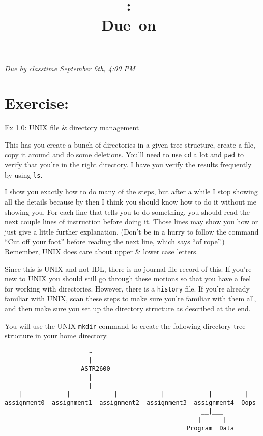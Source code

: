 \documentclass{article}
\title{\vspace{2in}\textmd{\textbf{\hmwkClass:\ \hmwkTitle}}\\\normalsize\vspace{0.1in}\small{Due\ on\ \hmwkDueDate}\\\vspace{0.1in}\large{}\vspace{3in}}
\date{}
\newcommand{\hmwkDueDate}{September 6th, 4:00 PM}
\begin{document}
\begin{spacing}{1.0}
\newpage
\emph{  Due by classtime \hmwkDueDate}
\section{\textbf{Exercise:} }

Ex 1.0: UNIX file \& directory management

This has you create a bunch of directories in a given tree structure, create a
file, copy it around and do some deletions.  You’ll need to use \texttt{cd} a lot and
\texttt{pwd} to verify that you’re in the right directory.  I have you verify the
results frequently by using \texttt{ls}.

I show you exactly how to do many of the steps, but after a while I stop
showing all the details because by then I think you should know how to do it
without me showing you.  For each line that tells you to do something, you
should read the next couple lines of instruction before doing it.  Those lines
may show you how or just give a little further explanation.  (Don’t be in a
hurry to follow the command “Cut off your foot” before reading the next line,
which says “of rope”.)  Remember, UNIX does care about upper \& lower case
letters.
	
Since this is UNIX and not IDL, there is no journal file record of this.  If
you’re new to UNIX you should still go through these motions so that you have a
feel for working with directories.  However, there is a \texttt{history} file.
If you’re already familiar with UNIX, scan these steps to make sure you’re
familiar with them all, and then make sure you set up the directory structure
as described at the end.

You will use the UNIX \texttt{mkdir} command to create the following directory
tree structure in your home directory.
\begin{verbatim}
                       ~
                       |
                     ASTR2600
                       |
     __________________|__________________________________________
    |            |            |            |            |         |
assignment0  assignment1  assignment2  assignment3  assignment4  Oops
                                                      __|___
                                                     |      |
                                                  Program  Data
\end{verbatim}


\end{spacing}
\end{document}
